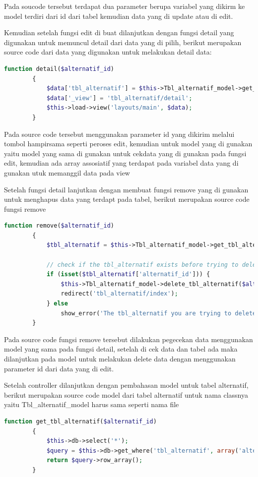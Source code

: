 Pada soucode tersebut terdapat dua parameter berupa variabel yang dikirm ke model terdiri dari id dari tabel kemudian data yang di update atau di edit.\par
Kemudian setelah fungsi edit di buat dilanjutkan dengan fungsi detail yang digunakan untuk memuncul detail dari data yang di pilih, berikut merupakan source code dari data yang digunakan untuk melakukan detail data:\par

\begin{lstlisting}[language=PHP]
	    function detail($alternatif_id)  
	    {  
	        $data['tbl_alternatif'] = $this->Tbl_alternatif_model->get_tbl_alternatif($alternatif_id);  
	        $data['_view'] = 'tbl_alternatif/detail';  
	        $this->load->view('layouts/main', $data);  
	    }
\end{lstlisting}

Pada source code tersebut menggunakan parameter id yang dikirim melalui tombol hampirsama seperti peroses edit, kemudian untuk model yang di gunakan yaitu model yang sama di gunakan untuk cekdata yang di gunakan pada fungsi edit, kemudian ada array assosiatif yang terdapat pada variabel data yang di gunakan utuk memanggil data pada view\par
	Setelah fungsi detail lanjutkan dengan membuat fungsi remove yang di gunakan untuk menghapus data yang terdapt pada tabel, berikut merupakan source code fungsi remove\par

\begin{lstlisting}[language=PHP]
	function remove($alternatif_id)  
	    {  
	        $tbl_alternatif = $this->Tbl_alternatif_model->get_tbl_alternatif($alternatif_id);  
	  
	        // check if the tbl_alternatif exists before trying to delete it  
	        if (isset($tbl_alternatif['alternatif_id'])) {  
	            $this->Tbl_alternatif_model->delete_tbl_alternatif($alternatif_id);  
	            redirect('tbl_alternatif/index');  
	        } else  
	            show_error('The tbl_alternatif you are trying to delete does not exist.');  
	    }

\end{lstlisting}

	Pada source code fungsi remove tersebut dilakukan pegecekan data menggunakan model yang sama pada fungsi detail, setelah di cek data dan tabel ada maka dilanjutkan pada model untuk melakukan delete data dengan menggunakan parameter id dari data yang di edit.\par
	Setelah controller dilanjutkan dengan pembahasan model untuk tabel alternatif, berikut merupakan source code model dari tabel alternatif untuk nama classnya yaitu Tbl\_alternatif\_model harus sama seperti nama file
\begin{lstlisting}[language=PHP]
	function get_tbl_alternatif($alternatif_id)  
	    {  
	        $this->db->select('*');  
	        $query = $this->db->get_where('tbl_alternatif', array('alternatif_id' => $alternatif_id));  
	        return $query->row_array();  
	    }  
\end{lstlisting}

